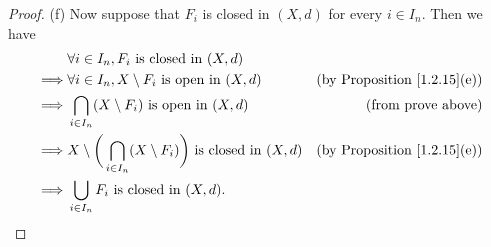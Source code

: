 \begin{proof}{(f)}
    Now suppose that \(F_i\) is closed in \((X, d)\) for every \(i \in I_n\).
    Then we have
    \begin{align*}
                 & \forall i \in I_n, F_i \text{ is closed in } (X, d)                                                                                  \\
        \implies & \forall i \in I_n, X \setminus F_i \text{ is open in } (X, d)                              & \text{(by Proposition \ref{1.2.15}(e))} \\
        \implies & \bigcap_{i \in I_n} (X \setminus F_i) \text{ is open in } (X, d)                           & \text{(from prove above)}               \\
        \implies & X \setminus \bigg(\bigcap_{i \in I_n} (X \setminus F_i)\bigg) \text{ is closed in } (X, d) & \text{(by Proposition \ref{1.2.15}(e))} \\
        \implies & \bigcup_{i \in I_n} F_i \text{ is closed in } (X, d).
    \end{align*}
\end{proof}

